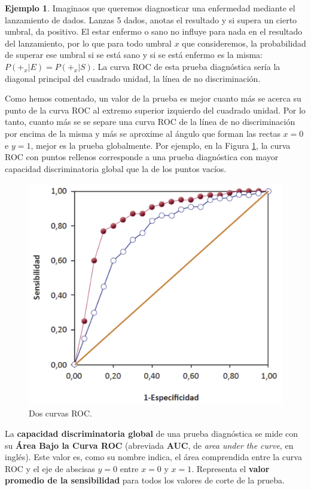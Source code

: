 \documentclass[
]{book}
\theoremstyle{definition}
\theoremstyle{definition}
\newtheorem{example}{Ejemplo}[chapter]
\theoremstyle{definition}
\theoremstyle{definition}
\theoremstyle{remark}
\begin{document}
\begin{example}
\protect\hypertarget{exm:unnamed-chunk-171}{}\label{exm:unnamed-chunk-171}Imaginaos que queremos diagnosticar una enfermedad mediante el lanzamiento de dados. Lanzas 5 dados, anotas el resultado y si supera un cierto umbral, da positivo. El estar enfermo o sano no influye para nada en el resultado del lanzamiento, por lo que para todo umbral \(x\) que consideremos, la probabilidad de superar ese umbral si se está sano y si se está enfermo es la misma: \(P(+_x|E)=P(+_x|S)\). La curva ROC de esta prueba diagnóstica sería la diagonal principal del cuadrado unidad, la línea de no discriminación.
\end{example}

Como hemos comentado, un valor de la prueba es mejor cuanto más se acerca su punto de la curva ROC al extremo superior izquierdo del cuadrado unidad. Por lo tanto, cuanto más se se separe una curva ROC de la línea de no discriminación por encima de la misma y más se aproxime al ángulo que forman las rectas \(x=0\) e \(y=1\), mejor es la prueba globalmente. Por ejemplo, en la Figura \ref{fig:roc3}, la curva ROC con puntos rellenos corresponde a una prueba diagnóstica con mayor capacidad discriminatoria global que la de los puntos vacíos.

\begin{figure}

{\centering \includegraphics[width=0.5\linewidth]{INREMDN_files/figure-html/roc3} 

}

\caption{Dos curvas ROC.}\label{fig:roc3}
\end{figure}

La \textbf{capacidad discriminatoria global} de una prueba diagnóstica se mide con su \textbf{Área Bajo la Curva ROC} (abreviada \textbf{AUC}, de \emph{area under the curve}, en inglés). Este valor es, como su nombre indica, el área comprendida entre la curva ROC y el eje de abscisas \(y=0\) entre \(x=0\) y \(x=1\). Representa el \textbf{valor promedio de la sensibilidad} para todos los valores de corte de la prueba.
\end{document}
